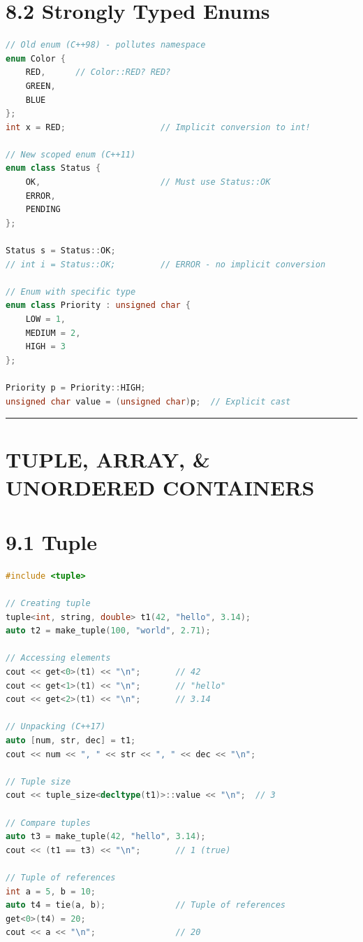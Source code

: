 \hypertarget{strongly-typed-enums}{%
\section{8.2 Strongly Typed Enums}\label{strongly-typed-enums}}

\begin{lstlisting}[language={C++}]
// Old enum (C++98) - pollutes namespace
enum Color {
    RED,      // Color::RED? RED?
    GREEN,
    BLUE
};
int x = RED;                   // Implicit conversion to int!

// New scoped enum (C++11)
enum class Status {
    OK,                        // Must use Status::OK
    ERROR,
    PENDING
};

Status s = Status::OK;
// int i = Status::OK;         // ERROR - no implicit conversion

// Enum with specific type
enum class Priority : unsigned char {
    LOW = 1,
    MEDIUM = 2,
    HIGH = 3
};

Priority p = Priority::HIGH;
unsigned char value = (unsigned char)p;  // Explicit cast
\end{lstlisting}

\begin{center}\rule{0.5\linewidth}{0.5pt}\end{center}

\hypertarget{tuple-array-unordered-containers}{%
\section{TUPLE, ARRAY, \& UNORDERED
CONTAINERS}\label{tuple-array-unordered-containers}}

\hypertarget{tuple}{%
\section{9.1 Tuple}\label{tuple}}

\begin{lstlisting}[language={C++}]
#include <tuple>

// Creating tuple
tuple<int, string, double> t1(42, "hello", 3.14);
auto t2 = make_tuple(100, "world", 2.71);

// Accessing elements
cout << get<0>(t1) << "\n";       // 42
cout << get<1>(t1) << "\n";       // "hello"
cout << get<2>(t1) << "\n";       // 3.14

// Unpacking (C++17)
auto [num, str, dec] = t1;
cout << num << ", " << str << ", " << dec << "\n";

// Tuple size
cout << tuple_size<decltype(t1)>::value << "\n";  // 3

// Compare tuples
auto t3 = make_tuple(42, "hello", 3.14);
cout << (t1 == t3) << "\n";       // 1 (true)

// Tuple of references
int a = 5, b = 10;
auto t4 = tie(a, b);              // Tuple of references
get<0>(t4) = 20;
cout << a << "\n";                // 20
\end{lstlisting}

